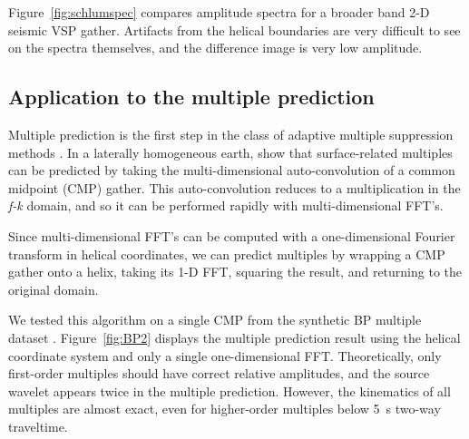 \par
Figure~\ref{fig:schlumspec} compares amplitude spectra for a broader 
band 2-D seismic VSP gather.  Artifacts from the helical boundaries
are very difficult to see on the spectra themselves, and the
difference image is very low amplitude.

\subsection{Application to the multiple prediction}
Multiple prediction is the first step in the class of adaptive
multiple suppression methods \cite{GEO.57.9.11661177}.  
In a laterally homogeneous earth,  show that 
surface-related multiples can be predicted by taking the
multi-dimensional auto-convolution of a common midpoint (CMP) gather.
This auto-convolution reduces to a multiplication in the {\em f-k}
domain, and so it can be performed rapidly with multi-dimensional
FFT's. 

\par
Since multi-dimensional FFT's can be computed with a one-dimensional
Fourier transform in helical coordinates, we can predict multiples by 
wrapping a CMP gather onto a helix, taking its 1-D FFT, squaring the 
result, and returning to the original domain.

\par
We tested this algorithm on a single CMP from the synthetic BP
multiple dataset \cite{BPmultiples}.
Figure~\ref{fig:BP2} displays the multiple prediction result using the
helical coordinate system and only a single one-dimensional FFT. 
Theoretically, only first-order multiples should have correct
relative amplitudes, and the source wavelet appears twice in the
multiple prediction.  However, the kinematics of all 
multiples are almost exact, even for higher-order multiples below 5~s 
two-way traveltime.

